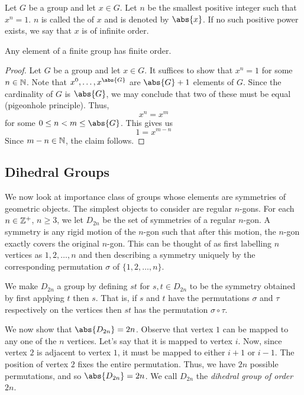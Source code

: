 \begin{defn} Let $G$ be a group and let $x \in G$. Let $n$ be the smallest positive integer such that $x^n = 1$. $n$ is called the  of $x$ and is denoted by $\abs{x}$. If no such positive power exists, we say that $x$ is of infinite order.
\end{defn}

\begin{prop} \label{thm:finite-group-finite-order}
    Any element of a finite group has finite order.
\end{prop}
\begin{proof}
    Let $G$ be a group and let $x \in G$. It suffices to show that $x^n = 1$ for some $n \in \mathbb{N}$. Note that $x^0, \ldots, x^{\abs{G}}$ are $\abs{G} + 1$ elements of $G$. Since the cardinality of $G$ is $\abs{G}$, we may conclude that two of these must be equal (pigeonhole principle). Thus, 
    \[
        x^n = x^m
    \]
    for some $0 \leq n < m \leq \abs{G}$. This gives us
    \[
        1 = x^{m-n}
    \]
    Since $m-n \in \mathbb{N}$, the claim follows.
\end{proof}

\subsection{Dihedral Groups}

We now look at importance class of groups whose elements are symmetries of geometric objects. The simplest objects to consider are regular $n$-gons. For each $n \in \mathbb{Z}^+$, $n \geq 3$, we let $D_{2n}$ be the set of symmetries of a regular $n$-gon. A symmetry is any rigid motion of the $n$-gon such that after this motion, the $n$-gon exactly covers the original $n$-gon. This can be thought of as first labelling $n$ vertices as $1, 2, \ldots, n$ and then describing a symmetry uniquely by the corresponding permutation $\sigma$ of $\{1,2,\ldots,n\}$. 

We make $D_{2n}$ a group by defining $st$ for $s,t \in D_{2n}$ to be the symmetry obtained by first applying $t$ then $s$. That is, if $s$ and $t$ have the permutations $\sigma$ and $\tau$ respectively on the vertices then $st$ has the permutation $\sigma \circ \tau$. 

We now show that $\abs{D_{2n}} = 2n$. Observe that vertex $1$ can be mapped to any one of the $n$ vertices. Let's say that it is mapped to vertex $i$. Now, since vertex $2$ is adjacent to vertex $1$, it must be mapped to either $i+1$ or $i-1$. The position of vertex $2$ fixes the entire permutation. Thus, we have $2n$ possible permutations, and so $\abs{D_{2n}} = 2n$. We call $D_{2n}$ the \emph{dihedral group of order $2n$}.

